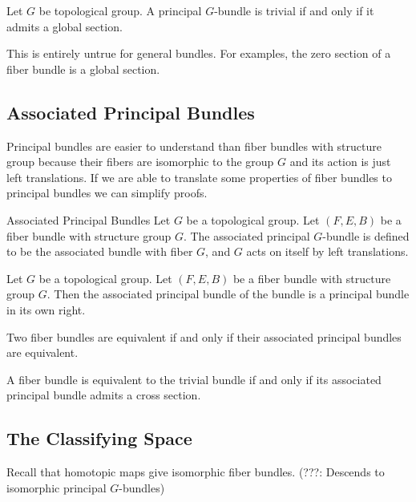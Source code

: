 \documentclass[a4paper]{article}
\begin{document}
\begin{thm}{}{} Let $G$ be topological group. A principal $G$-bundle is trivial if and only if it admits a global section. 
\end{thm}

This is entirely untrue for general bundles. For examples, the zero section of a fiber bundle is a global section. 

\subsection{Associated Principal Bundles}
Principal bundles are easier to understand than fiber bundles with structure group because their fibers are isomorphic to the group $G$ and its action is just left translations. If we are able to translate some properties of fiber bundles to principal bundles we can simplify proofs. 

\begin{defn}{Associated Principal Bundles}{} Let $G$ be a topological group. Let $(F,E,B)$ be a fiber bundle with structure group $G$. The associated principal $G$-bundle is defined to be the associated bundle with fiber $G$, and $G$ acts on itself by left translations. 
\end{defn}

\begin{prp}{}{} Let $G$ be a topological group. Let $(F,E,B)$ be a fiber bundle with structure group $G$. Then the associated principal bundle of the bundle is a principal bundle in its own right. 
\end{prp}

\begin{thm}{}{} Two fiber bundles are equivalent if and only if their associated principal bundles are equivalent. 
\end{thm}

\begin{crl}{}{} A fiber bundle is equivalent to the trivial bundle if and only if its associated principal bundle admits a cross section. 
\end{crl}

\subsection{The Classifying Space}
Recall that homotopic maps give isomorphic fiber bundles. (???: Descends to isomorphic principal $G$-bundles)
\end{document}
